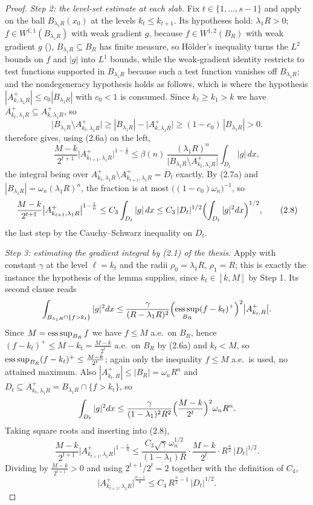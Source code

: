 \begin{proof}
\emph{Step 2: the level-set estimate at each slab.}  Fix $t\in\{1,\dots,s-1\}$
and apply  on the ball $B_{\lambda_1R}(x_0)$ at
the levels $k_t\le k_{t+1}$.  Its hypotheses hold: $\lambda_1R>0$;
$f\in W^{1,1}(B_{\lambda_1R})$ with weak gradient $g$, because
$f\in W^{1,2}(B_R)$ with weak gradient $g$ (),
$B_{\lambda_1R}\subseteq B_R$ has finite measure, so H\"older's inequality turns
the $L^2$ bounds on $f$ and $|g|$ into $L^1$ bounds, while the weak-gradient
identity restricts to test functions supported in $B_{\lambda_1R}$ because such a
test function vanishes off $B_{\lambda_1R}$; and the nondegeneracy hypothesis
holds as follows, which is where the hypothesis
$|A^+_{k,\lambda_1R}|\le c_0|B_{\lambda_1R}|$ with $c_0<1$ is consumed.  Since
$k_t\ge k_1>k$ we have $A^+_{k_t,\lambda_1R}\subseteq A^+_{k,\lambda_1R}$, so
\[
\bigl|B_{\lambda_1R}\setminus A^+_{k_t,\lambda_1R}\bigr|
\ge|B_{\lambda_1R}|-\bigl|A^+_{k,\lambda_1R}\bigr|
\ge(1-c_0)\,|B_{\lambda_1R}|>0 .
\tag{2.7a}
\]
 therefore gives, using (2.6a) on the left,
\[
\frac{M-k}{2^{t+1}}\bigl|A^+_{k_{t+1},\lambda_1R}\bigr|^{1-\frac1n}
\le\beta(n)\,\frac{(\lambda_1R)^n}
{\bigl|B_{\lambda_1R}\setminus A^+_{k_t,\lambda_1R}\bigr|}\int_{D_t}|g|\,dx ,
\tag{2.7}
\]
the integral being over
$A^+_{k_t,\lambda_1R}\setminus A^+_{k_{t+1},\lambda_1R}=D_t$ exactly.  By (2.7a)
and $|B_{\lambda_1R}|=\omega_n(\lambda_1R)^n$, the fraction is at most
$\bigl((1-c_0)\omega_n\bigr)^{-1}$, so
\[
\frac{M-k}{2^{t+1}}\bigl|A^+_{k_{t+1},\lambda_1R}\bigr|^{1-\frac1n}
\le C_3\int_{D_t}|g|\,dx
\le C_3\,|D_t|^{1/2}\Bigl(\int_{D_t}|g|^2dx\Bigr)^{1/2} ,
\tag{2.8}
\]
the last step by the Cauchy--Schwarz inequality on $D_t$.

\emph{Step 3: estimating the gradient integral by (2.1) of the thesis.}  Apply
 with constant $\gamma$ at the level $\ell=k_t$ and
the radii $\rho_0=\lambda_1R$, $\rho_1=R$; this is exactly the instance the
hypothesis of the lemma supplies, since $k_t\in[k,M]$ by Step 1.  Its second
clause reads
\[
\int_{B_{\lambda_1R}\cap\{f>k_t\}}|g|^2dx
\le\frac{\gamma}{(R-\lambda_1R)^2}
\Bigl(\operatorname*{ess\,sup}_{B_R}(f-k_t)^+\Bigr)^{2}\bigl|A^+_{k_t,R}\bigr| .
\]
Since $M=\operatorname*{ess\,sup}_{B_R}f$ we have $f\le M$ a.e.\ on $B_R$, hence
$(f-k_t)^+\le M-k_t=\frac{M-k}{2^{t}}$ a.e.\ on $B_R$ by (2.6a) and $k_t<M$, so
$\operatorname*{ess\,sup}_{B_R}(f-k_t)^+\le\frac{M-k}{2^{t}}$; again only the inequality
$f\le M$ a.e.\ is used, no attained maximum.  Also
$|A^+_{k_t,R}|\le|B_R|=\omega_nR^n$ and
$D_t\subseteq A^+_{k_t,\lambda_1R}=B_{\lambda_1R}\cap\{f>k_t\}$, so
\[
\int_{D_t}|g|^2dx\le\frac{\gamma}{(1-\lambda_1)^2R^2}
\Bigl(\frac{M-k}{2^{t}}\Bigr)^{2}\omega_nR^n .
\]
Taking square roots and inserting into (2.8),
\[
\frac{M-k}{2^{t+1}}\bigl|A^+_{k_{t+1},\lambda_1R}\bigr|^{1-\frac1n}
\le\frac{C_3\sqrt\gamma\,\omega_n^{1/2}}{(1-\lambda_1)R}\cdot\frac{M-k}{2^{t}}
\cdot R^{\frac n2}\,|D_t|^{1/2} .
\]
Dividing by $\frac{M-k}{2^{t+1}}>0$ and using
$2^{t+1}/2^{t}=2$ together with the definition of $C_4$,
\[
\bigl|A^+_{k_{t+1},\lambda_1R}\bigr|^{\frac{n-1}n}
\le C_4\,R^{\frac n2-1}\,|D_t|^{1/2} .
\tag{2.9}
\]


\end{proof}
